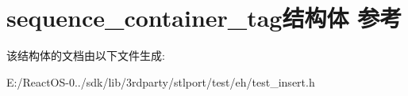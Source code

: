 \hypertarget{structsequence__container__tag}{}\section{sequence\+\_\+container\+\_\+tag结构体 参考}
\label{structsequence__container__tag}


该结构体的文档由以下文件生成\+:\begin{DoxyCompactItemize}
\item 
E\+:/\+React\+O\+S-\/0../sdk/lib/3rdparty/stlport/test/eh/test\+\_\+insert.\+h\end{DoxyCompactItemize}
